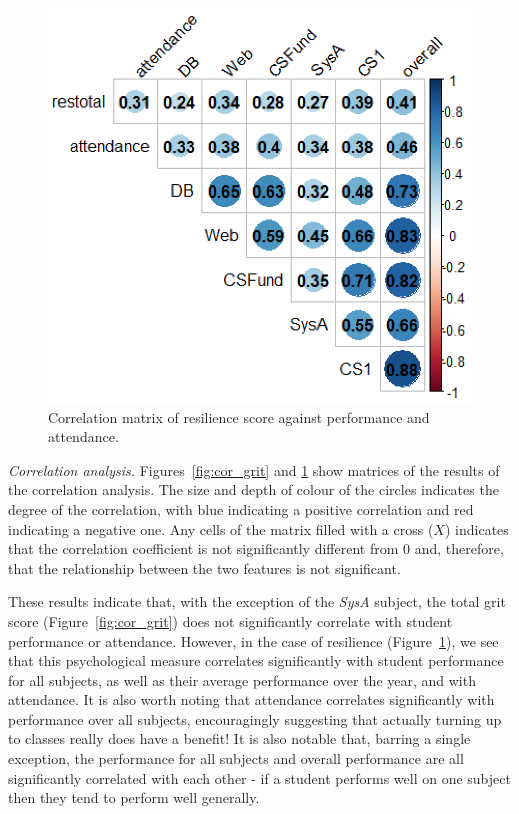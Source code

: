 \documentclass[sigconf]{acmart}
\begin{document}
\begin{figure}[h]
\centering
\includegraphics[width=.9\linewidth]{images/cor_plot_res.png}
\caption{Correlation matrix of resilience score against performance and attendance.}
\label{fig:cor_res} 
\end{figure}

{\em Correlation analysis.}
Figures~\ref{fig:cor_grit} and \ref{fig:cor_res} show matrices of the results of the correlation analysis. The size and depth of colour of the circles indicates the degree of the correlation, with blue indicating a positive correlation and red indicating a negative one. Any cells of the matrix filled with a cross ($X$) indicates that the correlation coefficient is not significantly different from 0 and, therefore, that the relationship between the two features is not significant.

These results indicate that, with the exception of the {\em SysA} subject, the total grit score (Figure~\ref{fig:cor_grit}) does not significantly correlate with student performance or attendance. However, in the case of resilience (Figure~\ref{fig:cor_res}), we see that this psychological measure correlates significantly with student performance for all subjects, as well as their average performance over the year, and with attendance. It is also worth noting that attendance correlates significantly with performance over all subjects, encouragingly suggesting that actually turning up to classes really does have a benefit! It is also notable that, barring a single exception, the performance for all subjects and overall performance are all significantly correlated with each other - if a student performs well on one subject then they tend to perform well generally. 
\end{document}
